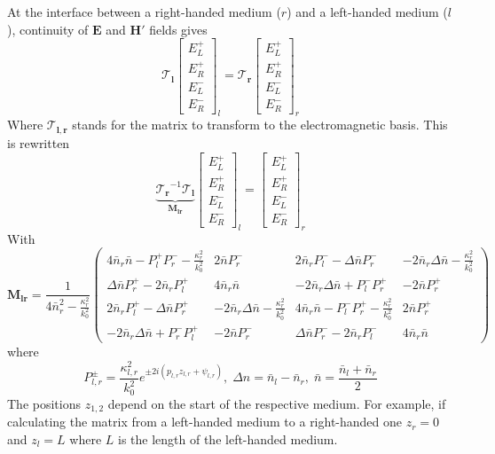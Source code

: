 At the interface between a right-handed medium ($r$) and a left-handed medium ($l$), continuity of $\bm{E}$ and $\bm{H'}$ fields gives
\begin{equation}
\bm{\mathcal{T}_l}\begin{bmatrix}
E_L^+\\E_R^+\\E_L^-\\E_R^-
\end{bmatrix}_l = \bm{\mathcal{T}_r}\begin{bmatrix}
E_L^+\\E_R^+\\E_L^-\\E_R^-
\end{bmatrix}_r
\end{equation}
Where $\bm{\mathcal{T}_{l,r}}$ stands for the matrix to transform to the electromagnetic basis. This is rewritten
\begin{equation}
\underbrace{\bm{\mathcal{T}_r}^{-1}\bm{\mathcal{T}_l}}_{\bm{M_{lr}}}\begin{bmatrix}
E_L^+\\E_R^+\\E_L^-\\E_R^-
\end{bmatrix}_l = \begin{bmatrix}
E_L^+\\E_R^+\\E_L^-\\E_R^-
\end{bmatrix}_r
\end{equation}
With
\begin{equation}
\bm{M_{lr}} = \frac{1}{4 \bar{n}_{r}^{2} - \frac{\kappa_{r}^{2}}{k_0^2}}\begin{pmatrix}
4\bar{n}_{r}\bar{n} - P_l^+P_r^- - \frac{\kappa_{r}^{2}}{k_0^2} & 2 \bar{n} P_r^- & 2 \bar{n}_{r} P_l^- - \Delta\bar{n}P_r^- & -2\bar{n}_r\Delta\bar{n} - \frac{\kappa_{r}^{2}}{k_0^2}\\
\Delta\bar{n}P^+_r - 2 \bar{n}_{r}P_l^+ & 4 \bar{n}_{r} \bar{n} & - 2 \bar{n}_{r} \Delta\bar{n} + P_l^-P_r^+ & - 2\bar{n}P_r^+\\
2 \bar{n}_{r}P_l^+ -\Delta\bar{n}P^+_r & - 2 \bar{n}_{r} \Delta\bar{n} - \frac{\kappa_{r}^{2}}{k_0^2} & 4 \bar{n}_{r} \bar{n} - P_l^-P_r^+ - \frac{\kappa_{r}^{2}}{k_0^2} & 2\bar{n}P_r^+\\
- 2 \bar{n}_{r} \Delta\bar{n} + P_r^-P_l^+ & - 2\bar{n}P_r^- & \Delta\bar{n}P_r^- - 2\bar{n}_{r} P_l^- & 4\bar{n}_r\bar{n}
\end{pmatrix}
\end{equation}
where
\begin{equation}
P_{l,r}^\pm = \frac{\kappa_{l,r}^{2}}{k_0^2}e^{\pm 2i(p_{l,r}z_{l,r}+\psi_{l,r})} ,\; \Delta n = \bar{n}_l - \bar{n}_r ,\; \bar{n} = \frac{\bar{n}_l+\bar{n}_r}{2}
\end{equation}
The positions $z_{1,2}$ depend on the start of the respective medium. For example, if calculating the matrix from a left-handed medium to a right-handed one $z_r=0$ and $z_l=L$ where $L$ is the length of the left-handed medium.

